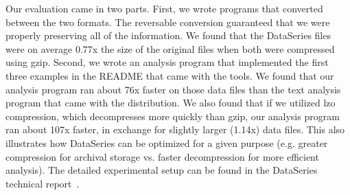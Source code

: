 \documentclass{acm_proc_article-sp}
\begin{document}
Our evaluation came in two parts.  First, we wrote programs that
converted between the two formats.  The reversable conversion
guaranteed that we were properly preserving all of the information.
We found that the DataSeries files were on average 0.77x the size of
the original files when both were compressed using gzip.  Second, we
wrote an analysis program that implemented the first three examples in
the README that came with the tools.  We found that our analysis
program ran about 76x faster on those data files than the text
analysis program that came with the distribution.  We also found that
if we utilized lzo compression, which decompresses more quickly than
gzip, our analysis program ran about 107x faster, in exchange for
slightly larger (1.14x) data files.  This also illustrates how
DataSeries can be optimized for a given purpose (e.g. greater
compression for archival storage vs. faster decompression for more
efficient analysis). The detailed experimental setup can be found in
the DataSeries technical report~\cite{DSTechnicalReportSnapshot}.


%
 
\end{document}
